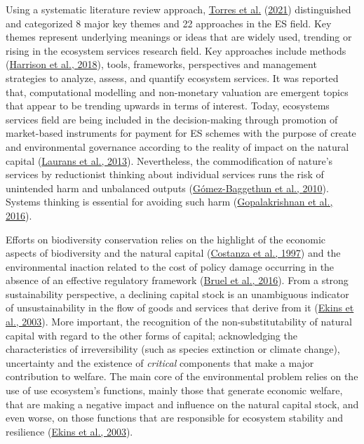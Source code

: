\documentclass[]{elsarticle} %
\begin{document}
Using a systematic literature review approach, \protect\hyperlink{ref-Torres2021}{Torres et al.} (\protect\hyperlink{ref-Torres2021}{2021}) distinguished and categorized 8 major key themes and 22 approaches in the ES field. Key themes represent underlying meanings or ideas that are widely used, trending or rising in the ecosystem services research field.
Key approaches include methods (\protect\hyperlink{ref-Harrison2018}{Harrison et al., 2018}), tools, frameworks, perspectives and management strategies to analyze, assess, and quantify ecosystem services.
It was reported that, computational modelling and non-monetary valuation are emergent topics that appear to be trending upwards in terms of interest.
Today, ecosystems services field are being included in the decision-making through promotion of market-based instruments for payment for ES schemes with the purpose of create and environmental governance according to the reality of impact on the natural capital (\protect\hyperlink{ref-Laurans2013}{Laurans et al., 2013}).
Nevertheless, the commodification of nature's services by reductionist thinking about individual services runs the risk of unintended harm and unbalanced outputs (\protect\hyperlink{ref-Gomez-Baggethun2010}{Gómez-Baggethun et al., 2010}).
Systems thinking is essential for avoiding such harm (\protect\hyperlink{ref-Gopalakrishnan2016}{Gopalakrishnan et al., 2016}).

Efforts on biodiversity conservation relies on the highlight of the economic aspects of biodiversity and the natural capital (\protect\hyperlink{ref-Costanza1997}{Costanza et al., 1997}) and the environmental inaction related to the cost of policy damage occurring in the absence of an effective regulatory framework (\protect\hyperlink{ref-Bruel2016}{Bruel et al., 2016}).
From a strong sustainability perspective, a declining capital stock is an unambiguous indicator of unsustainability in the flow of goods and services that derive from it (\protect\hyperlink{ref-Ekins2003}{Ekins et al., 2003}).
More important, the recognition of the non-substitutability of natural capital with regard to the other forms of capital; acknowledging the characteristics of irreversibility (such as species extinction or climate change), uncertainty and the existence of \emph{critical} components that make a major contribution to welfare.
The main core of the environmental problem relies on the use of use ecosystem's functions, mainly those that generate economic welfare, that are making a negative impact and influence on the natural capital stock, and even worse, on those functions that are responsible for ecosystem stability and resilience (\protect\hyperlink{ref-Ekins2003}{Ekins et al., 2003}).
\end{document}
